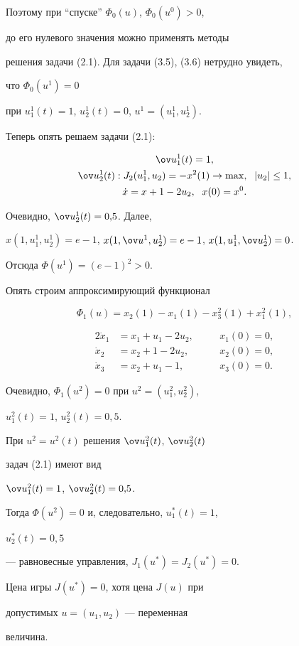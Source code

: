 \begin{exam}
Поэтому при ``спуске'' $\Phi_0(u)$, $\Phi_0(u^0)>0$,


до его нулевого значения можно применять методы


решения задачи (2.1). Для задачи (3.5), (3.6) нетрудно увидеть, 


что $\Phi_0(u^1)=0$


при $u_1^1(t)=1$, $u_2^1(t)=0$, $u^1=(u^1_1,u^1_2)$.


Теперь опять решаем задачи (2.1):


\begin{gather*}


\ov u_1^1(t)=1, \\


\ov u_2^1(t): J_2(u_1^1,u_2)=-x^2(1)\to \max,\ \; |u_2|\leq 1, \\


\Dot x=x+1-2u_2,\ \; x(0)=x^0.


\end{gather*}


Очевидно, $\ov u_2^1(t)=0{,}5$. Далее, 


$x(1,u_1^1,u_2^1)=e-1$, $x(1,\ov u^1,u_2^1)=e-1$, $x(1,u^1_1,\ov u_2^1)=0$.


Отсюда $\Phi(u^1)=(e-1)^2>0$.


Опять строим аппроксимирующий функционал


$$


\Phi_1(u)=x_2(1)-x_1(1)-x_3^2(1)+x_1^2(1),


$$


\vskip -8mm





\begin{alignat*}{2}


\Dot x_1&=x_1+u_1-2u_2, &\quad &x_1(0)=0,\\


\dot x_2&=x_2+1-2u_2, &\quad &x_2(0)=0,\\


\dot x_3&=x_2+u_1-1, &\quad &x_3(0)=0.


\end{alignat*}


Очевидно, $\Phi_1(u^2)=0$ при $u^2=(u_1^2,u_2^2)$,


$u_1^2(t)=1$, $u_2^2(t)=0{,}5$.


При $u^2=u^2(t)$ решения $\ov u_1^2(t)$, $\ov u_2^2(t)$


задач (2.1) имеют вид


$\ov u_1^2(t)=1$, $\ov u_2^2(t)=0{,}5$.


Тогда $\Phi(u^2)=0$ и, следовательно, $u_1^{\ast}(t)=1$,


$u_2^{\ast}(t)=0{,}5$ 


--- равновесные управления, $J_1(u^{\ast})=J_2(u^{\ast})=0$.


Цена игры $J(u^{\ast})=0$, хотя цена $J(u)$ при 


допустимых $u=(u_1,u_2)$ --- переменная 


величина.


\end{exam}





